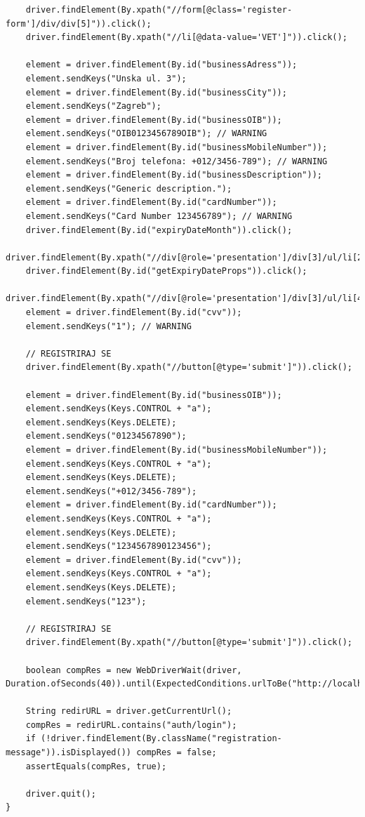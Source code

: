 \begin{lstlisting}
    driver.findElement(By.xpath("//form[@class='register-form']/div/div[5]")).click();
    driver.findElement(By.xpath("//li[@data-value='VET']")).click();

    element = driver.findElement(By.id("businessAdress"));
    element.sendKeys("Unska ul. 3");
    element = driver.findElement(By.id("businessCity"));
    element.sendKeys("Zagreb");
    element = driver.findElement(By.id("businessOIB"));
    element.sendKeys("OIB0123456789OIB"); // WARNING
    element = driver.findElement(By.id("businessMobileNumber"));
    element.sendKeys("Broj telefona: +012/3456-789"); // WARNING
    element = driver.findElement(By.id("businessDescription"));
    element.sendKeys("Generic description.");
    element = driver.findElement(By.id("cardNumber"));
    element.sendKeys("Card Number 123456789"); // WARNING
    driver.findElement(By.id("expiryDateMonth")).click();
    driver.findElement(By.xpath("//div[@role='presentation']/div[3]/ul/li[2]")).click();
    driver.findElement(By.id("getExpiryDateProps")).click();
    driver.findElement(By.xpath("//div[@role='presentation']/div[3]/ul/li[4]")).click();
    element = driver.findElement(By.id("cvv"));
    element.sendKeys("1"); // WARNING

    // REGISTRIRAJ SE
    driver.findElement(By.xpath("//button[@type='submit']")).click();

    element = driver.findElement(By.id("businessOIB"));
    element.sendKeys(Keys.CONTROL + "a");
    element.sendKeys(Keys.DELETE);
    element.sendKeys("01234567890");
    element = driver.findElement(By.id("businessMobileNumber"));
    element.sendKeys(Keys.CONTROL + "a");
    element.sendKeys(Keys.DELETE);
    element.sendKeys("+012/3456-789");
    element = driver.findElement(By.id("cardNumber"));
    element.sendKeys(Keys.CONTROL + "a");
    element.sendKeys(Keys.DELETE);
    element.sendKeys("1234567890123456");
    element = driver.findElement(By.id("cvv"));
    element.sendKeys(Keys.CONTROL + "a");
    element.sendKeys(Keys.DELETE);
    element.sendKeys("123");

    // REGISTRIRAJ SE
    driver.findElement(By.xpath("//button[@type='submit']")).click();

    boolean compRes = new WebDriverWait(driver, Duration.ofSeconds(40)).until(ExpectedConditions.urlToBe("http://localhost:3000/auth/login"));

    String redirURL = driver.getCurrentUrl();
    compRes = redirURL.contains("auth/login");
    if (!driver.findElement(By.className("registration-message")).isDisplayed()) compRes = false;
    assertEquals(compRes, true);

    driver.quit();
}
        \end{lstlisting}


